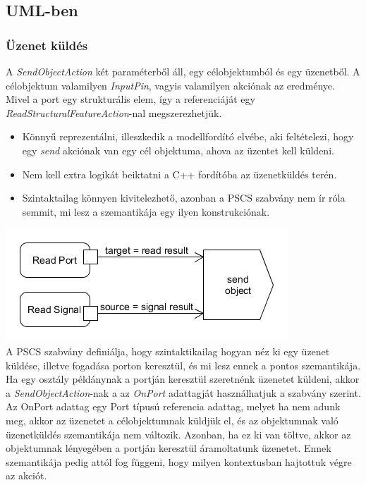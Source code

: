 \documentclass[a4paper,12pt]{report}
\begin{document}
\subsection{UML-ben}

\subsubsection{Üzenet küldés}
A  \textit{SendObjectAction} két paraméterből áll, egy célobjektumból és egy üzenetből.
A célobjektum valamilyen \textit{InputPin}, vagyis valamilyen akciónak az eredménye.
Mivel a port egy strukturális elem, így a referenciáját egy \textit{ReadStructuralFeatureAction}-nal megszerezhetjük. 
\begin{itemize}
\item Könnyű reprezentálni, illeszkedik a modellfordító elvébe, aki feltételezi, hogy
egy \textit{send} akciónak van egy cél objektuma, ahova az üzentet kell küldeni.
\item Nem kell extra logikát beiktatni a C++ fordítóba az üzenetküldés terén.
\item Szintaktailag könnyen kivitelezhető, azonban a PSCS szabvány nem ír róla semmit, mi lesz a szemantikája egy ilyen konstrukciónak.
\end{itemize}

\includegraphics[scale=0.8]{send_uml.png} \\

A PSCS szabvány definiálja, hogy szintaktikailag hogyan néz ki egy üzenet küldése, illetve fogadása porton keresztül, és mi lesz ennek a pontos szemantikája. \\
Ha egy osztály példánynak a portján keresztül szeretnénk üzenetet küldeni, akkor a \textit{SendObjectAction}-nak a az \textit{OnPort} adattagját használhatjuk a szabvány szerint.  Az OnPort adattag egy Port típusú referencia adattag, melyet ha nem adunk meg, akkor az üzenetet a célobjektumnak küldjük el, és az objektumnak való üzenetküldés szemantikája nem változik.  Azonban, ha ez ki van töltve, akkor az objektumnak lényegében a portján keresztül áramoltatunk üzenetet. Ennek szemantikája pedig attól fog függeni, hogy milyen kontextusban hajtottuk végre az akciót. \\
\end{document}
